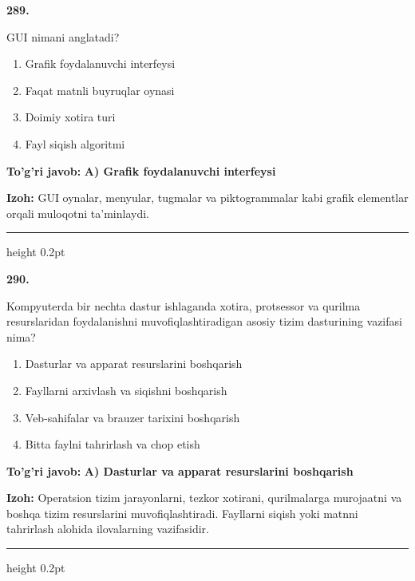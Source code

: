 \documentclass[10pt,a4paper]{article}
\begin{document}
{\bfseries\sffamily\color{ink} 289.}
\par
GUI nimani anglatadi?
\begin{enumerate}[label=\Alph*),leftmargin=9mm]
\item Grafik foydalanuvchi interfeysi
\item Faqat matnli buyruqlar oynasi
\item Doimiy xotira turi
\item Fayl siqish algoritmi
\end{enumerate}
\begin{tcolorbox}[enhanced,breakable,colback=teal!4,colframe=teal!60!black,boxrule=0.45pt,arc=1.2mm,left=2.7mm,right=2.7mm,top=1.8mm,bottom=1.8mm,before skip=2mm,after skip=2mm]
{\bfseries\sffamily\color{teal}To'g'ri javob:} \textbf{A) Grafik foydalanuvchi interfeysi}
\par\smallskip
{\bfseries Izoh:} GUI oynalar, menyular, tugmalar va piktogrammalar kabi grafik elementlar orqali muloqotni ta'minlaydi.
\end{tcolorbox}
\vspace{2mm}\hrule height 0.2pt\vspace{3mm}

{\bfseries\sffamily\color{ink} 290.}
\par
Kompyuterda bir nechta dastur ishlaganda xotira, protsessor va qurilma resurslaridan foydalanishni muvofiqlashtiradigan asosiy tizim dasturining vazifasi nima?
\begin{enumerate}[label=\Alph*),leftmargin=9mm]
\item Dasturlar va apparat resurslarini boshqarish
\item Fayllarni arxivlash va siqishni boshqarish
\item Veb-sahifalar va brauzer tarixini boshqarish
\item Bitta faylni tahrirlash va chop etish
\end{enumerate}
\begin{tcolorbox}[enhanced,breakable,colback=teal!4,colframe=teal!60!black,boxrule=0.45pt,arc=1.2mm,left=2.7mm,right=2.7mm,top=1.8mm,bottom=1.8mm,before skip=2mm,after skip=2mm]
{\bfseries\sffamily\color{teal}To'g'ri javob:} \textbf{A) Dasturlar va apparat resurslarini boshqarish}
\par\smallskip
{\bfseries Izoh:} Operatsion tizim jarayonlarni, tezkor xotirani, qurilmalarga murojaatni va boshqa tizim resurslarini muvofiqlashtiradi. Fayllarni siqish yoki matnni tahrirlash alohida ilovalarning vazifasidir.
\end{tcolorbox}
\vspace{2mm}\hrule height 0.2pt\vspace{3mm}
\end{document}
